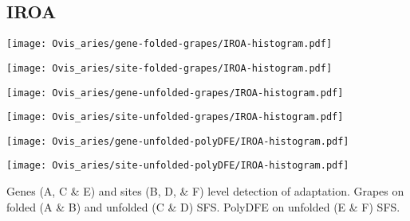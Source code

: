 \documentclass{article}
\begin{document}
\subsection{IROA}
\centering
\begin{minipage}{0.49\linewidth}
    \texttt{[image: Ovis\_aries/gene-folded-grapes/IROA-histogram.pdf]}
\end{minipage}%
\hfill
\begin{minipage}{0.49\linewidth}
    \texttt{[image: Ovis\_aries/site-folded-grapes/IROA-histogram.pdf]}
\end{minipage}
\hfill
\begin{minipage}{0.49\linewidth}
    \texttt{[image: Ovis\_aries/gene-unfolded-grapes/IROA-histogram.pdf]}
\end{minipage}%
\hfill
\begin{minipage}{0.49\linewidth}
    \texttt{[image: Ovis\_aries/site-unfolded-grapes/IROA-histogram.pdf]}
\end{minipage}
\hfill
\begin{minipage}{0.49\linewidth}
    \texttt{[image: Ovis\_aries/gene-unfolded-polyDFE/IROA-histogram.pdf]}
\end{minipage}%
\hfill
\begin{minipage}{0.49\linewidth}
    \texttt{[image: Ovis\_aries/site-unfolded-polyDFE/IROA-histogram.pdf]}
\end{minipage}
\hfill
\flushleft
Genes (A, C \& E) and sites (B, D, \& F) level detection of adaptation.
Grapes on folded (A \& B) and unfolded (C \& D) SFS.
PolyDFE on unfolded (E \& F) SFS.

\pagebreak
\end{document}
